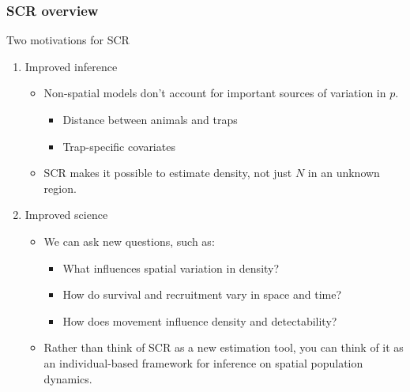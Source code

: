 \documentclass[color=usenames,dvipsnames]{beamer}\usepackage[]{graphicx}\usepackage[]{xcolor}
\begin{document}
\begin{frame}
  \frametitle{SCR overview}
  {\centering \large Two motivations for SCR \\}
  \vfill
  \begin{enumerate}
    \item Improved inference
    \begin{itemize}
      \item<1-> Non-spatial models don't account for important sources
        of variation in $p$. %
        \begin{itemize}
          \item<1-> Distance between animals and traps
          \item<1-> Trap-specific covariates
        \end{itemize}
      \item<2-> SCR makes it possible to estimate \alert{density}, not
        just $N$ in an unknown region. 
    \end{itemize}
    \pause
    \vfill
  \item<3-> Improved science
  \begin{itemize}
    \item<3-> We can ask new questions, such as:
      \begin{itemize}
        \item<3-> What influences spatial variation in density?
        \item<4-> How do survival and recruitment vary in space and time?
        \item<5-> How does movement influence density and detectability?
      \end{itemize}
    \item<6-> Rather than think of SCR as a new estimation tool, you
      can think of it as an individual-based framework for inference on
      spatial population dynamics.
    \end{itemize}
  \end{enumerate}
\end{frame}
\end{document}
